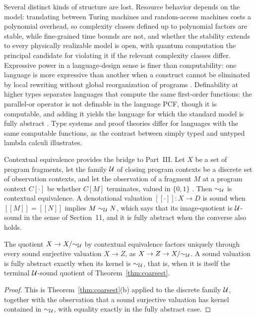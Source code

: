 Several distinct kinds of structure are lost. Resource behavior depends on the model: translating between Turing machines and random-access machines costs a polynomial overhead, so complexity classes defined up to polynomial factors are stable, while fine-grained time bounds are not, and whether the stability extends to every physically realizable model is open, with quantum computation the principal candidate for violating it if the relevant complexity classes differ. Expressive power in a language-design sense is finer than computability: one language is more expressive than another when a construct cannot be eliminated by local rewriting without global reorganization of programs \cite{felleisen}. Definability at higher types separates languages that compute the same first-order functions: the parallel-or operator is not definable in the language PCF, though it is computable, and adding it yields the language for which the standard model is fully abstract \cite{plotkin}. Type systems and proof theories differ for languages with the same computable functions, as the contrast between simply typed and untyped lambda calculi illustrates.

Contextual equivalence provides the bridge to Part~III. Let $X$ be a set of program fragments, let the family $\mathcal U$ of closing program contexts be a discrete set of observation contexts, and let the observation of a fragment $M$ at a program context $C[\cdot]$ be whether $C[M]$ terminates, valued in $\{0,1\}$ \cite{morris}. Then $\sim_\mathcal U$ is contextual equivalence. A denotational valuation $[\![\cdot]\!]:X\to D$ is sound when $[\![M]\!]=[\![N]\!]$ implies $M\sim_\mathcal U N$, which says that its image-quotient is $\mathcal U$-sound in the sense of Section~11, and it is fully abstract when the converse also holds.

\begin{proposition}\label{prop:fullabs}
The quotient $X\to X/{\sim_\mathcal U}$ by contextual equivalence factors uniquely through every sound surjective valuation $X\to Z$, as $X\to Z\to X/{\sim_\mathcal U}$. A sound valuation is fully abstract exactly when its kernel is $\sim_\mathcal U$, that is, when it is itself the terminal $\mathcal U$-sound quotient of Theorem~\ref{thm:coarsest}.
\end{proposition}
\begin{proof}
This is Theorem~\ref{thm:coarsest}(b) applied to the discrete family $\mathcal U$, together with the observation that a sound surjective valuation has kernel contained in $\sim_\mathcal U$, with equality exactly in the fully abstract case.
\end{proof}

